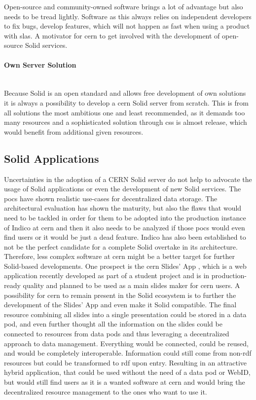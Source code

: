 Open-source and community-owned software brings a lot of advantage but also needs to be tread lightly. Software as this always relies on independent developers to fix bugs, develop features, which will not happen as fast when using a product with \glspl{sla}. A motivator for \gls{cern} to get involved with the development of open-source Solid services.
\vspace{0.5cm}
\paragraph{Own Server Solution}\mbox{}\\

Because Solid is an open standard and allows free development of own solutions it is always a possibility to develop a \gls{cern} Solid server from scratch. This is from all solutions the most ambitious one and least recommended, as it demands too many resources and a sophisticated solution through \gls{css} is almost release, which would benefit from additional given resources.

\subsection{Solid Applications}

Uncertainties in the adoption of a CERN Solid server do not help to advocate the usage of Solid applications or even the development of new Solid services. The \glspl{poc} have shown realistic use-cases for decentralized data storage. The architectural evaluation has shown the maturity, but also the flaws that would need to be tackled in order for them to be adopted into the production instance of Indico at \gls{cern} and then it also needs to be analyzed if those \glspl{poc} would even find users or it would be just a dead feature. Indico has also been established to not be the perfect candidate for a complete Solid overtake in its architecture. Therefore, less complex software at \gls{cern} might be a better target for further Solid-based developments. One prospect is the \gls{cern} Slides' App \cite{cern-slides}, which is a web application recently developed as part of a student project and is in production-ready quality and planned to be used as a main slides maker for \gls{cern} users. A possibility for \gls{cern} to remain present in the Solid ecosystem is to further the development of the Slides' App and even make it Solid compatible. The final resource combining all slides into a single presentation could be stored in a data pod, and even further thought all the information on the slides could be connected to resources from data pods and thus leveraging a decentralized approach to data management. Everything would be connected, could be reused, and would be completely interoperable. Information could still come from non-\gls{rdf} resources but could be transformed to \gls{rdf} upon entry. Resulting in an attractive hybrid application, that could be used without the need of a data pod or WebID, but would still find users as it is a wanted software at \gls{cern} and would bring the decentralized resource management to the ones who want to use it.

